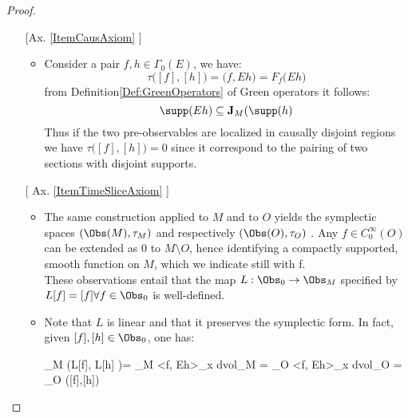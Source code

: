 \documentclass[Main]{subfiles}
\begin{document}
				\begin{proof}
					\forcenewline
					\begin{itemize}
						\item[ [Ax. \ref{ItemCausAxiom}]]
							\begin{itemize}
								\item Consider a pair $f,h \in \Gamma_0 (E)$, we have:
									\begin{displaymath}
										\tau \big([f] , [h] \big) = \big(f, Eh \big) = F_f \big( E h \big)
									\end{displaymath}
									from Definition\ref{Def:GreenOperators} of Green operators it follows:
									\begin{displaymath}
										\supp ( E h) \subseteq \textbf{J}_M ( \supp(h)
									\end{displaymath}
									Thus if the two pre-observables are localized in causally disjoint regions we have $\tau \big([f] , [h] \big)=0 $ since it correspond to the pairing of two sections with disjoint supports.
							\end{itemize}
						\item[[ Ax. \ref{ItemTimeSliceAxiom}]]
							\begin{itemize}
								\item %
									The same construction applied to $M$ and to $O$ yields the symplectic spaces $(\Obs(M),\tau_M)$ and respectively $(\Obs(O),\tau_O)$ .
									Any $f\in C^\infty_0(O)$ can be extended as $0$ to $M\setminus O$, hence identifying a compactly supported, smooth function on $M$, which we indicate still with f.\\
									These observations entail that the map $L: \Obs_0 \rightarrow \Obs_M$ specified by $L [f]= [f] \forall f \in \Obs_0$ is well-defined.
								\item %
									Note that $L$ is linear and that it preserves the symplectic form. In fact, given $[ f ], [h] \in \Obs_0$, one has:
									\begin{compactdisplaymath}
										\tau_M \big(L[f], L[h] \big)= \int_M <f, Eh>_x d\textrm{vol}_M =
										 \int_O <f, Eh>_x d\textrm{vol}_O = \tau_O \big([f],[h]\big)

\end{compactdisplaymath}
\end{itemize}
\end{itemize}
\end{proof}
\end{document}
